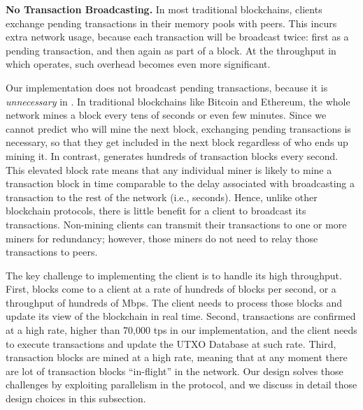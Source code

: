 
\noindent\textbf{No Transaction Broadcasting.}
In most traditional blockchains, clients exchange pending transactions in their memory pools with peers. This incurs extra network usage, because each transaction will be broadcast twice: first as a pending transaction, and then again as part of a block. At the throughput in which \prism operates, such overhead becomes even more significant.

Our implementation does not broadcast pending transactions, because it is \textit{unnecessary} in \prism. 
In traditional blockchains like Bitcoin and Ethereum, the whole network mines a block every tens of seconds or even few minutes. 
Since we cannot predict who will mine the next block, exchanging pending transactions is necessary, so that they get included in the next block regardless of who ends up mining it. In contrast, \prism generates hundreds of transaction blocks every second. This elevated block rate means that any individual miner is likely to mine a transaction block in time comparable to the delay associated with broadcasting a transaction to the rest of the network (i.e., seconds). Hence, unlike other blockchain protocols, there is little benefit for a \prism client to broadcast its transactions. Non-mining clients can transmit their transactions to one or more miners for redundancy; however, those miners do not need to relay those transactions to peers. 








The key challenge to implementing the \prism client is to handle its high throughput. First, blocks come to a client at a rate of hundreds of blocks per second, or a throughput of hundreds of Mbps. The client needs to process those blocks and update its view of the blockchain in real time. Second, transactions are confirmed at a high rate, higher than 70,000 tps in our implementation, and the client needs to execute transactions and update the UTXO Database at such rate. Third, transaction blocks are mined at a high rate, meaning that at any moment there are lot of transaction blocks ``in-flight'' in the network. Our design solves those challenges by exploiting parallelism in the protocol, and we discuss in detail those design choices in this subsection.


